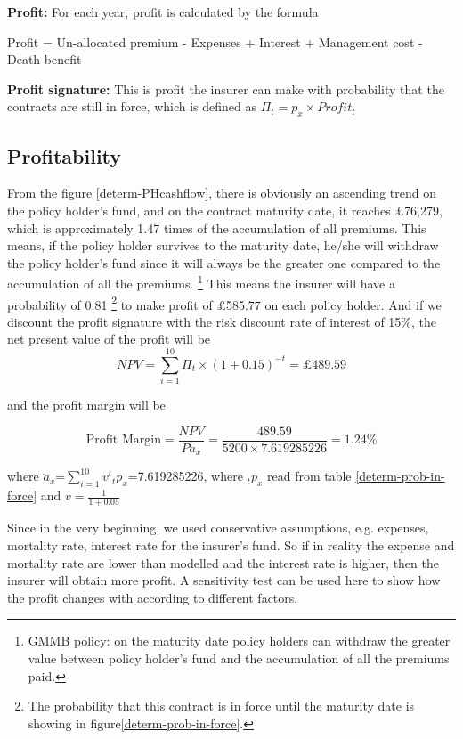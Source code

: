 \documentclass{report}
\begin{document}
\textbf{Profit:} For each year, profit is calculated by the formula

Profit = Un-allocated premium - Expenses + Interest + Management cost - Death benefit

\textbf{Profit signature:} This is profit the insurer can make with probability that the contracts are still in force, which is defined as $\Pi_t = p_x \times Profit_t$


\subsection{Profitability}


From the figure \ref{determ-PHcashflow}, there is obviously an ascending trend on the policy holder's fund, and on the contract maturity date, it reaches \pounds 76,279, which is approximately 1.47 times of the accumulation of all premiums. This means, if the policy holder survives to the maturity date, he/she will withdraw the policy holder's fund since it will always be the greater one compared to the accumulation of all the premiums. \footnote{GMMB policy: on the maturity date policy holders can withdraw the greater value between policy holder's fund and the accumulation of all the premiums paid.} This means the insurer will have a probability of 0.81 \footnote{The probability that this contract is in force until the maturity date is showing in figure\ref{determ-prob-in-force}.} to make profit of \pounds 585.77 on each policy holder. And if we discount the profit signature with the risk discount rate of interest of 15\%, the net present value of the profit will be 
\[
 NPV=\sum_{i=1}^{10} \Pi_t \times (1+0.15)^{-t} = \pounds 489.59
\]
 
and the profit margin will be


\[
\text{Profit\ Margin} =  \frac{NPV}{P \ddot{a}_x}
= \frac{489.59}{5200 \times 7.619285226}  = 1.24\%
\]


where $\ddot{a}_x$=$\sum_{i=1}^{10} v^t {_tp_x}$=7.619285226, where $_tp_x$
read from table \ref{determ-prob-in-force} and $v=\frac{1}{1+0.05}$  



Since in the very beginning, we used conservative assumptions, e.g. expenses, mortality rate, interest rate for the insurer's fund. So if in reality the expense and mortality rate are lower than modelled and the interest rate is higher, then the insurer will obtain more profit. A sensitivity test can be used here to show how the profit changes with according to different factors. 
\end{document}
